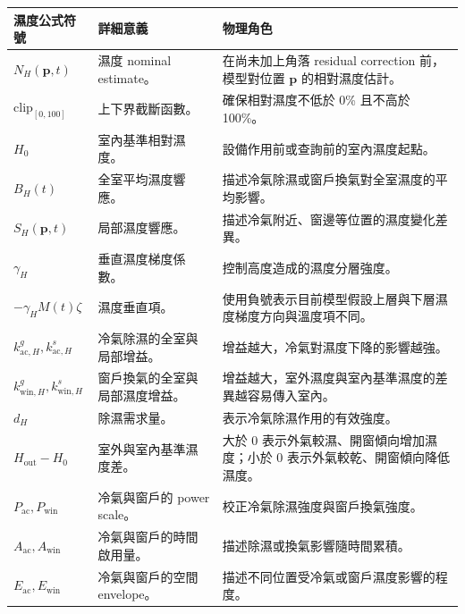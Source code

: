 \documentclass[12pt,a4paper]{article}
\begin{document}
\begin{table}[htbp]
\centering
\footnotesize
\renewcommand{\arraystretch}{1.25}
\begin{tabular}{|>{\raggedright\arraybackslash}p{}|>{\raggedright\arraybackslash}p{}|>{\raggedright\arraybackslash}p{}|}
\hline
\textbf{濕度公式符號} & \textbf{詳細意義} & \textbf{物理角色} \\
\hline
$N_H(\mathbf{p},t)$ & 濕度 nominal estimate。 & 在尚未加上角落 residual correction 前，模型對位置 $\mathbf{p}$ 的相對濕度估計。 \\
\hline
$\mathrm{clip}_{[0,100]}$ & 上下界截斷函數。 & 確保相對濕度不低於 0\% 且不高於 100\%。 \\
\hline
$H_0$ & 室內基準相對濕度。 & 設備作用前或查詢前的室內濕度起點。 \\
\hline
$B_H(t)$ & 全室平均濕度響應。 & 描述冷氣除濕或窗戶換氣對全室濕度的平均影響。 \\
\hline
$S_H(\mathbf{p},t)$ & 局部濕度響應。 & 描述冷氣附近、窗邊等位置的濕度變化差異。 \\
\hline
$\gamma_H$ & 垂直濕度梯度係數。 & 控制高度造成的濕度分層強度。 \\
\hline
$-\gamma_H M(t)\zeta$ & 濕度垂直項。 & 使用負號表示目前模型假設上層與下層濕度梯度方向與溫度項不同。 \\
\hline
$k_{\mathrm{ac},H}^{g},k_{\mathrm{ac},H}^{s}$ & 冷氣除濕的全室與局部增益。 & 增益越大，冷氣對濕度下降的影響越強。 \\
\hline
$k_{\mathrm{win},H}^{g},k_{\mathrm{win},H}^{s}$ & 窗戶換氣的全室與局部濕度增益。 & 增益越大，室外濕度與室內基準濕度的差異越容易傳入室內。 \\
\hline
$d_H$ & 除濕需求量。 & 表示冷氣除濕作用的有效強度。 \\
\hline
$H_{\mathrm{out}}-H_0$ & 室外與室內基準濕度差。 & 大於 0 表示外氣較濕、開窗傾向增加濕度；小於 0 表示外氣較乾、開窗傾向降低濕度。 \\
\hline
$P_{\mathrm{ac}},P_{\mathrm{win}}$ & 冷氣與窗戶的 power scale。 & 校正冷氣除濕強度與窗戶換氣強度。 \\
\hline
$A_{\mathrm{ac}},A_{\mathrm{win}}$ & 冷氣與窗戶的時間啟用量。 & 描述除濕或換氣影響隨時間累積。 \\
\hline
$E_{\mathrm{ac}},E_{\mathrm{win}}$ & 冷氣與窗戶的空間 envelope。 & 描述不同位置受冷氣或窗戶濕度影響的程度。 \\
\hline
\end{tabular}
\end{table}
\end{document}
